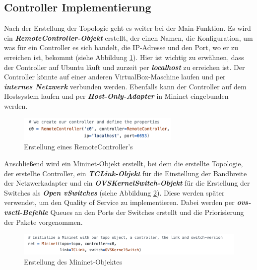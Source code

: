 \documentclass[fontsize=12pt,paper=a4,open=any,parskip=half,
  twoside=false,toc=listof,toc=bibliography,fleqn,leqno,
  captions=nooneline,captions=tableabove,british]{scrbook}
\begin{document}
\newpage
\subsection{Controller Implementierung}
Nach der Erstellung der Topologie geht es weiter bei der Main-Funktion. Es wird ein \textit{\textbf{RemoteController-Objekt}} erstellt, der einen Namen, die Konfiguration, um was für ein Controller es sich handelt, die IP-Adresse und den Port, wo er zu erreichen ist, bekommt (siehe Abbildung \ref{mininet5}). Hier ist wichtig zu erwähnen, dass der Controller auf Ubuntu läuft und zurzeit per \textit{\textbf{localhost}} zu erreichen ist. Der Controller könnte auf einer anderen VirtualBox-Maschine laufen und per \textit{\textbf{internes Netzwerk}} verbunden werden. Ebenfalls kann der Controller auf dem Hostsystem laufen und per \textit{\textbf{Host-Only-Adapter}} in Mininet eingebunden werden. 

\begin{figure}[H]
 \centering
 \includegraphics[width=0.7\textwidth]{Bilder/mininet5}
 \captionsetup{justification=centering,margin=1cm}
 \caption{Erstellung eines RemoteController's}
 \label{mininet5}
\end{figure}

Anschließend wird ein Mininet-Objekt erstellt, bei dem die erstellte Topologie, der erstellte Controller, ein \textit{\textbf{TCLink-Objekt}} für die Einstellung der Bandbreite der Netzwerkadapter und ein \textit{\textbf{OVSKernelSwitch-Objekt}} für die Erstellung der Switches als \textit{\textbf{Open vSwitches}} (siehe Abbildung \ref{mininet6}). Diese werden später verwendet, um den Quality of Service zu implementieren. Dabei werden per \textit{\textbf{ovs-vsctl-Befehle}} Queues an den Ports der Switches erstellt und die Priorisierung der Pakete vorgenommen.

\begin{figure}[H]
 \centering
 \includegraphics[width=1.0\textwidth]{Bilder/mininet6}
 \captionsetup{justification=centering,margin=1cm}
 \caption{Erstellung des Mininet-Objektes}
 \label{mininet6}
\end{figure}
\end{document}
